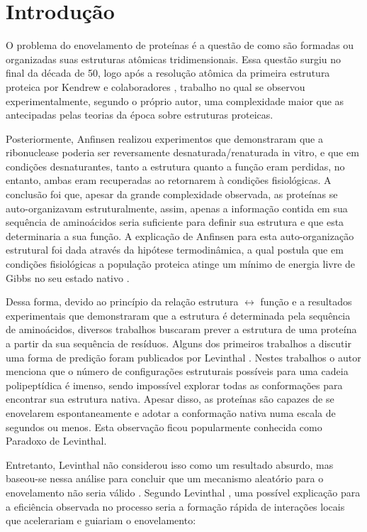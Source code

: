 \chapter{Introdução}\label{ch:introducao}

O problema do enovelamento de proteínas é a questão de como são formadas ou organizadas suas estruturas atômicas tridimensionais. Essa questão surgiu no final da década de 50, logo após a resolução atômica da primeira estrutura proteica por Kendrew e colaboradores \cite{KENDREW1958}, trabalho no qual se observou experimentalmente, segundo o próprio autor, uma complexidade maior que as antecipadas pelas teorias da época sobre estruturas proteicas. 

Posteriormente, Anfinsen \cite{Anfinsen1973} realizou experimentos que demonstraram que a ribonuclease poderia ser reversamente desnaturada/renaturada in vitro, e que em condições desnaturantes, tanto a estrutura quanto a função eram perdidas, no entanto, ambas eram recuperadas ao retornarem à condições fisiológicas. A conclusão foi que, apesar da grande complexidade observada, as proteínas se auto-organizavam estruturalmente, assim, apenas a informação contida em sua sequência de aminoácidos seria suficiente para definir sua estrutura e que esta determinaria a sua função. A explicação de Anfinsen para esta auto-organização estrutural foi dada através da hipótese termodinâmica, a qual postula que em condições fisiológicas a população proteica atinge um mínimo de energia livre de Gibbs no seu estado nativo \cite{Rose2006}.

Dessa forma, devido ao princípio da relação estrutura $\leftrightarrow$ função e a resultados experimentais que demonstraram que a estrutura é determinada pela sequência de aminoácidos, diversos trabalhos buscaram prever a estrutura de uma proteína a partir da sua sequência de resíduos. Alguns dos primeiros trabalhos a discutir uma forma de predição foram publicados por Levinthal \cite{Levinthal1968, Levinthal1969}. Nestes trabalhos o autor menciona que o número de configurações estruturais possíveis para uma cadeia polipeptídica é imenso, sendo impossível explorar todas as conformações para encontrar sua estrutura nativa. Apesar disso, as proteínas são capazes de se enovelarem espontaneamente e adotar a conformação nativa numa escala de segundos ou menos. Esta observação ficou popularmente conhecida como Paradoxo de Levinthal. 

Entretanto, Levinthal não considerou isso como um resultado absurdo, mas baseou-se nessa análise para concluir que um mecanismo aleatório para o enovelamento não seria válido \cite{Ben-Naim2012}. Segundo Levinthal \cite{Levinthal1968}, uma possível explicação para a eficiência observada no processo seria a formação rápida de interações locais que acelerariam e guiariam o enovelamento:

